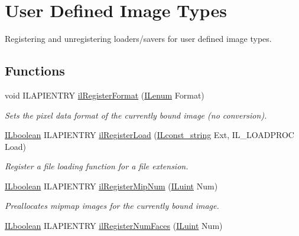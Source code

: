 \hypertarget{group__register}{\section{User Defined Image Types}
\label{group__register}
}


Registering and unregistering loaders/savers for user defined image types.  


\subsection*{Functions}
\begin{DoxyCompactItemize}
\item 
void I\+L\+A\+P\+I\+E\+N\+T\+R\+Y \hyperlink{group__register_gab16decaa97a48109c9decee6eaa65d2b}{il\+Register\+Format} (\hyperlink{group__il__types_ga62ca73445716183ef42b1f3906a45ed0}{I\+Lenum} Format)
\begin{DoxyCompactList}\small\item\em Sets the pixel data format of the currently bound image (no conversion). \end{DoxyCompactList}\item 
\hypertarget{group__register_ga187276b36d61a040c08efdb6350b4824}{\hyperlink{group__il__types_gaa6aa7c95cfdc06b4d8601ef832b7bb0a}{I\+Lboolean} I\+L\+A\+P\+I\+E\+N\+T\+R\+Y \hyperlink{group__register_ga187276b36d61a040c08efdb6350b4824}{il\+Register\+Load} (\hyperlink{group__il__types_ga1aa1edc3eb344e14acacb02bade24a5a}{I\+Lconst\+\_\+string} Ext, I\+L\+\_\+\+L\+O\+A\+D\+P\+R\+O\+C Load)}\label{group__register_ga187276b36d61a040c08efdb6350b4824}

\begin{DoxyCompactList}\small\item\em Register a file loading function for a file extension. \end{DoxyCompactList}\item 
\hypertarget{group__register_ga7908a7a8f4b3544b76411300e1059bc9}{\hyperlink{group__il__types_gaa6aa7c95cfdc06b4d8601ef832b7bb0a}{I\+Lboolean} I\+L\+A\+P\+I\+E\+N\+T\+R\+Y \hyperlink{group__register_ga7908a7a8f4b3544b76411300e1059bc9}{il\+Register\+Mip\+Num} (\hyperlink{group__il__types_gaff8e86a1072c8d7cfe387fb87c6ed8e1}{I\+Luint} Num)}\label{group__register_ga7908a7a8f4b3544b76411300e1059bc9}

\begin{DoxyCompactList}\small\item\em Preallocates mipmap images for the currently bound image. \end{DoxyCompactList}\item 
\hypertarget{group__register_ga309eed368a7585dfaa12ed096d2fcef5}{\hyperlink{group__il__types_gaa6aa7c95cfdc06b4d8601ef832b7bb0a}{I\+Lboolean} I\+L\+A\+P\+I\+E\+N\+T\+R\+Y \hyperlink{group__register_ga309eed368a7585dfaa12ed096d2fcef5}{il\+Register\+Num\+Faces} (\hyperlink{group__il__types_gaff8e86a1072c8d7cfe387fb87c6ed8e1}{I\+Luint} Num)}\label{group__register_ga309eed368a7585dfaa12ed096d2fcef5}


\end{DoxyCompactItemize}
